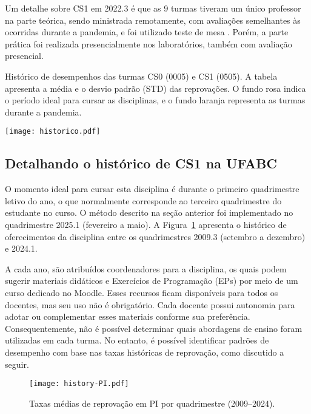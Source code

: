 Um detalhe sobre CS1 em 2022.3 é que as 9 turmas tiveram um único professor na parte teórica, sendo ministrada remotamente, com avaliações semelhantes às ocorridas durante a pandemia, e foi utilizado teste de mesa \cite{2023:Teubl.Zampirolli}. Porém, a parte prática foi realizada presencialmente nos laboratórios, também com avaliação presencial.


\begin{table}[!ht]
    \centering
    \caption{Histórico de desempenhos das turmas CS0 (0005) e CS1 (0505). A tabela apresenta a média e o desvio padrão (STD) das reprovações. O fundo rosa indica o período ideal para cursar as disciplinas, e o fundo laranja representa as turmas durante a pandemia.}
    \hspace*{1cm}
    \texttt{[image: historico.pdf]}
    \label{fig:historicoCS0_1}
\end{table}

\subsection*{Detalhando o histórico de CS1 na UFABC}

O momento ideal para cursar esta disciplina é durante o primeiro quadrimestre letivo do ano, o que normalmente corresponde ao terceiro quadrimestre do estudante no curso. O método descrito na seção anterior foi implementado no quadrimestre 2025.1 (fevereiro a maio). A Figura~\ref{fig:failure-history-PI} apresenta o histórico de oferecimentos da disciplina entre os quadrimestres 2009.3 (setembro a dezembro) e 2024.1.

A cada ano, são atribuídos coordenadores para a disciplina, os quais podem sugerir materiais didáticos e Exercícios de Programação (EPs) por meio de um curso dedicado no Moodle. Esses recursos ficam disponíveis para todos os docentes, mas seu uso não é obrigatório. Cada docente possui autonomia para adotar ou complementar esses materiais conforme sua preferência. Consequentemente, não é possível determinar quais abordagens de ensino foram utilizadas em cada turma. No entanto, é possível identificar padrões de desempenho com base nas taxas históricas de reprovação, como discutido a seguir.

\begin{figure}[ht]
  \centering
  \texttt{[image: history-PI.pdf]}
  \caption{Taxas médias de reprovação em PI por quadrimestre (2009–2024).}
  \label{fig:failure-history-PI}
\end{figure}


